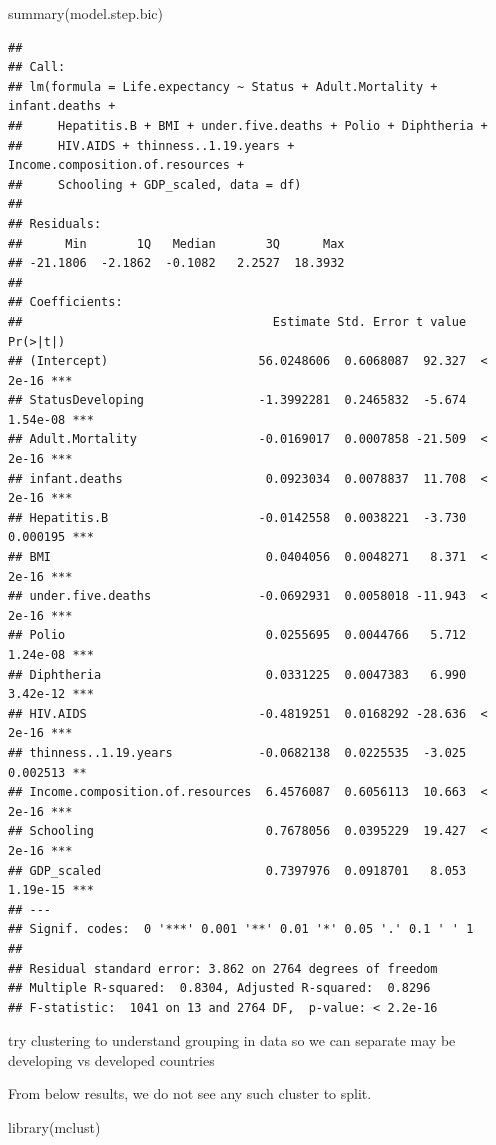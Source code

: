 \documentclass[
]{article}
\newenvironment{Shaded}{\begin{snugshade}}{\end{snugshade}}
\newcommand{\FunctionTok}[1]{\textcolor[rgb]{0.00,0.00,0.00}{#1}}
\newcommand{\NormalTok}[1]{#1}
\begin{document}
\begin{Shaded}
\begin{Highlighting}[]
\FunctionTok{summary}\NormalTok{(model.step.bic)}
\end{Highlighting}
\end{Shaded}

\begin{verbatim}
## 
## Call:
## lm(formula = Life.expectancy ~ Status + Adult.Mortality + infant.deaths + 
##     Hepatitis.B + BMI + under.five.deaths + Polio + Diphtheria + 
##     HIV.AIDS + thinness..1.19.years + Income.composition.of.resources + 
##     Schooling + GDP_scaled, data = df)
## 
## Residuals:
##      Min       1Q   Median       3Q      Max 
## -21.1806  -2.1862  -0.1082   2.2527  18.3932 
## 
## Coefficients:
##                                   Estimate Std. Error t value Pr(>|t|)    
## (Intercept)                     56.0248606  0.6068087  92.327  < 2e-16 ***
## StatusDeveloping                -1.3992281  0.2465832  -5.674 1.54e-08 ***
## Adult.Mortality                 -0.0169017  0.0007858 -21.509  < 2e-16 ***
## infant.deaths                    0.0923034  0.0078837  11.708  < 2e-16 ***
## Hepatitis.B                     -0.0142558  0.0038221  -3.730 0.000195 ***
## BMI                              0.0404056  0.0048271   8.371  < 2e-16 ***
## under.five.deaths               -0.0692931  0.0058018 -11.943  < 2e-16 ***
## Polio                            0.0255695  0.0044766   5.712 1.24e-08 ***
## Diphtheria                       0.0331225  0.0047383   6.990 3.42e-12 ***
## HIV.AIDS                        -0.4819251  0.0168292 -28.636  < 2e-16 ***
## thinness..1.19.years            -0.0682138  0.0225535  -3.025 0.002513 ** 
## Income.composition.of.resources  6.4576087  0.6056113  10.663  < 2e-16 ***
## Schooling                        0.7678056  0.0395229  19.427  < 2e-16 ***
## GDP_scaled                       0.7397976  0.0918701   8.053 1.19e-15 ***
## ---
## Signif. codes:  0 '***' 0.001 '**' 0.01 '*' 0.05 '.' 0.1 ' ' 1
## 
## Residual standard error: 3.862 on 2764 degrees of freedom
## Multiple R-squared:  0.8304, Adjusted R-squared:  0.8296 
## F-statistic:  1041 on 13 and 2764 DF,  p-value: < 2.2e-16
\end{verbatim}

try clustering to understand grouping in data so we can separate may be
developing vs developed countries

From below results, we do not see any such cluster to split.

\begin{Shaded}
\begin{Highlighting}[]
\FunctionTok{library}\NormalTok{(mclust)}
\end{Highlighting}
\end{Shaded}
\end{document}
